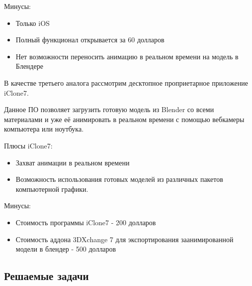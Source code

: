Минусы:
\begin{itemize}
	\item Только iOS
	\item Полный функционал открывается за 60 долларов
	\item Нет возможности переносить анимацию в реальном времени на модель в Блендере
\end{itemize}

В качестве третьего аналога рассмотрим десктопное проприетарное приложение iClone7.

Данное ПО позволяет загрузить готовую модель из Blender со всеми материалами и уже её анимировать в реальном времени с помощью вебкамеры компьютера или ноутбука.

Плюсы iClone7:
\begin{itemize}
	\item Захват анимации в реальном времени
	\item Возможность использования готовых моделей из различных пакетов компьютерной графики.
\end{itemize}
Минусы:
\begin{itemize}
	\item Стоимость программы iClone7 - 200 долларов
	\item Стоимость аддона 3DXchange 7 для экспортирования заанимированной модели в блендер - 500 долларов
\end{itemize}


\subsection{Решаемые задачи}


\clearpage
